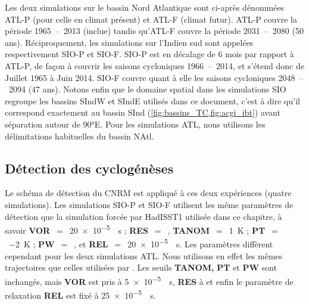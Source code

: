 \documentclass[../main.tex]{subfiles}
\begin{document}
Les deux simulations sur le bassin Nord Atlantique sont ci-après dénommées ATL-P (pour celle en climat présent) et ATL-F (climat futur). ATL-P couvre la période
\num{1965}~--~\num{2013} (inclue) tandis qu'ATL-F couvre la période \num{2031}~--~\num{2080} (50 ans). Réciproquement, les simulations sur l'Indien sud sont appelées
respectivement SIO-P et SIO-F. SIO-P est en décalage de \num{6} mois par rapport à ATL-P, de façon à couvrir les saisons cycloniques \num{1966}~--~\num{2014},
et s'étend donc de Juillet \num{1965} à Juin \num{2014}. SIO-F couvre quant à elle les saisons cycloniques \num{2048}~--~\num{2094} (47 ans). Notons enfin que
le domaine spatial dans les simulations SIO regroupe les bassins SIndW et SIndE utilisés dans ce document, c'est à dire qu'il correspond exactement au bassin
SInd (\cref{fig:bassins_TC,fig:acgi_ibt}) avant séparation autour de \ang{90}E. Pour les simulations ATL, nous utilisons les délimitations habituelles du bassin
NAtl.

\subsection{Détection des cyclogénèses}

Le schéma de détection du CNRM est appliqué à ces deux expériences (quatre simulations). Les simulations SIO-P et SIO-F utilisent les même paramètres de
détection que la simulation forcée par HadISST1 utilisée dans ce chapitre, à savoir \textbf{VOR}~$=$~\SI{20e-5}{\per\second} ; \textbf{RES}~$=$~,
\textbf{TANOM}~$=$~\SI{1}{\kelvin} ; \textbf{PT}~$=$~\SI{-2}{\kelvin} ; \textbf{PW}~$=$~, et \textbf{REL}~$=$~\SI{20e-5}{\per\second}. Les paramètres
diffèrent cependant pour les deux simulations ATL. Nous utilisons en effet les mêmes trajectoires que celles utilisées par \textcite{chauvin_future_2020}. Les
seuils \textbf{TANOM,} \textbf{PT} et \textbf{PW} sont inchangés, mais \textbf{VOR} est pris à \SI{5e-5}{\per\second}, \textbf{RES} à  et enfin le
paramètre de relaxation \textbf{REL} est fixé à \SI{25e-5}{\per\second}.
\end{document}
